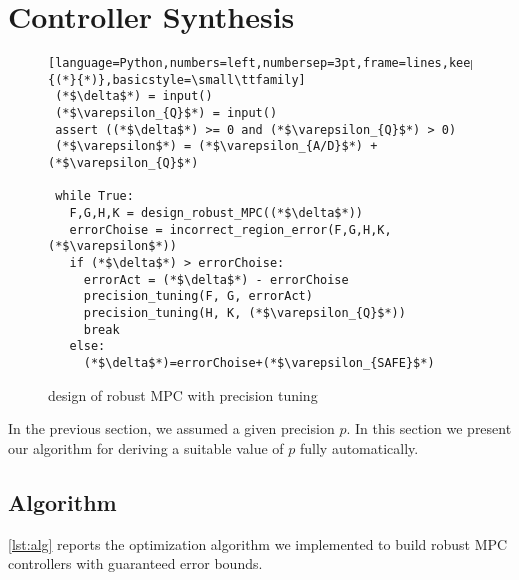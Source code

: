 \section{Controller Synthesis}\label{sec:Controller_Synthesis}

\begin{figure}
\begin{lstlisting}[language=Python,numbers=left,numbersep=3pt,frame=lines,keepspaces=true,escapeinside={(*}{*)},basicstyle=\small\ttfamily]
 (*$\delta$*) = input()
 (*$\varepsilon_{Q}$*) = input()
 assert ((*$\delta$*) >= 0 and (*$\varepsilon_{Q}$*) > 0)
 (*$\varepsilon$*) = (*$\varepsilon_{A/D}$*) + (*$\varepsilon_{Q}$*)

 while True:
   F,G,H,K = design_robust_MPC((*$\delta$*))
   errorChoise = incorrect_region_error(F,G,H,K,(*$\varepsilon$*))
   if (*$\delta$*) > errorChoise:
     errorAct = (*$\delta$*) - errorChoise
     precision_tuning(F, G, errorAct)
     precision_tuning(H, K, (*$\varepsilon_{Q}$*))
     break
   else:
     (*$\delta$*)=errorChoise+(*$\varepsilon_{SAFE}$*)
\end{lstlisting}
\caption{design of robust MPC with precision tuning}
\label{lst:alg}
\end{figure}


In the previous section, we assumed a given precision $p$. In this section we
present our algorithm for deriving a suitable value of $p$ fully automatically.

\subsection{Algorithm}
\autoref{lst:alg} reports the optimization algorithm we implemented to build robust MPC controllers with guaranteed error bounds.

